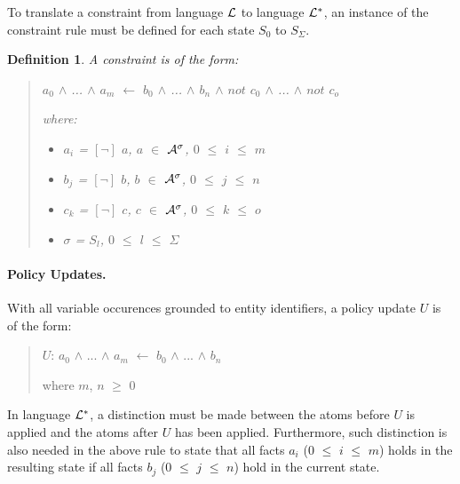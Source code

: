 \documentclass[10pt, twocolumn]{article}
\newtheorem{definition}{Definition}
\begin{document}
          To translate a constraint from language ${\cal L}$ to language
          ${\cal L}^{*}$, an instance of the constraint rule must be defined
          for each state $S_{0}$ to $S_{\Sigma}$.

          \begin{definition}
            A constraint is of the form:

            \begin{quote}
              $a_{0}$ $\land$ ... $\land$ $a_{m}$ $\leftarrow$ $b_{0}$ $\land$ ... $\land$ $b_{n}$ $\land$ $not$ $c_{0}$ $\land$ ... $\land$ $not$ $c_{o}$

              where:

              \begin{itemize}
                \item
                  $a_{i}$ = $[\lnot]$ $a$, $a$ $\in$ ${\cal A}^{\sigma}$, $0$ $\leq$ $i$ $\leq$ $m$
                \item
                  $b_{j}$ = $[\lnot]$ $b$, $b$ $\in$ ${\cal A}^{\sigma}$, $0$ $\leq$ $j$ $\leq$ $n$
                \item
                  $c_{k}$ = $[\lnot]$ $c$, $c$ $\in$ ${\cal A}^{\sigma}$, $0$ $\leq$ $k$ $\leq$ $o$
                \item
                  $\sigma$ = $S_{l}$, $0$ $\leq$ $l$ $\leq$ $\Sigma$
              \end{itemize}

            \end{quote}

          \end{definition}

        \paragraph{Policy Updates.}

          With all variable occurences grounded to entity identifiers, a
          policy update $U$ is of the form:

          \begin{quote}
            $U$: $a_{0}$ $\land$ ... $\land$ $a_{m}$ $\leftarrow$ $b_{0}$ $\land$ ... $\land$ $b_{n}$

            where $m$, $n$ $\geq$ $0$
          \end{quote}

          In language ${\cal L}^{*}$, a distinction must be made between the
          atoms before $U$ is applied and the atoms after $U$ has been applied.
          Furthermore, such distinction is also needed in the above rule to
          state that all facts $a_{i}$ ($0$ $\leq$ $i$ $\leq$ $m$) holds in
          the resulting state if all facts $b_{j}$ ($0$ $\leq$ $j$ $\leq$ $n$)
          hold in the current state.
\end{document}
